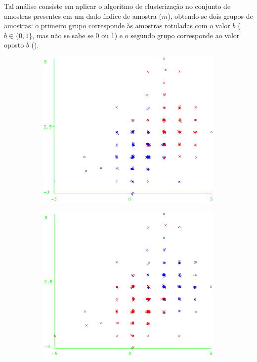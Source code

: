 \documentclass{SBCbookchapter}
\begin{document}
Tal análise consiste em aplicar o algoritmo de clusterização no conjunto de amostras presentes em um dado índice de amostra ($m$), obtendo-se dois grupos de amostras: o primeiro grupo corresponde às amostras rotuladas com o valor $b$ ($b\in \{0,1\}$, mas não se sabe se 0 ou 1) e o segundo grupo corresponde ao valor oposto $\bar{b}$ ().

\begin{figure}
	\centering
	\begin{subfigure}[b]{0.4\textwidth}
		\includegraphics[width=1\linewidth]{figures/Clustering_EM_2_POIs__clusters.png}
		\caption{}
		\label{fig:clusteringClusters}
	\end{subfigure}
	\hfill
	\begin{subfigure}[b]{0.4\textwidth}
		\includegraphics[width=1\linewidth]{figures/Clustering_EM_2_POIs__correct_labels.png}

\end{subfigure}
\end{figure}
\end{document}
